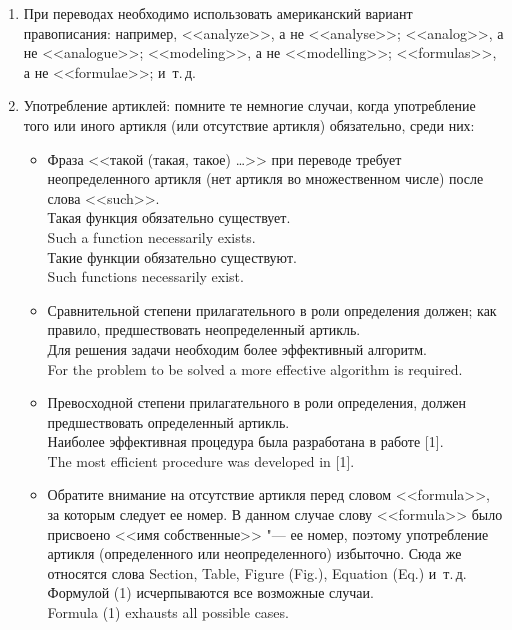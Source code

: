 \documentclass[a5paper, 10pt, twoside, numbers=enddot]{scrartcl}
\newcommand{\etc}{и~т.\,д.\xspace}
\begin{document}
\begin{enumerate}
  \item При переводах необходимо использовать американский вариант правописания: например,
    <<analyze>>, а не <<analyse>>; <<analog>>, а не <<analogue>>; <<modeling>>, а не <<modelling>>;
    <<formulas>>, а не <<formulae>>; \etc

  \item Употребление артиклей: помните те немногие случаи, когда употребление того или иного артикля
    (или отсутствие артикля) обязательно, среди них:
    \begin{itemize}
      \item Фраза <<такой (такая, такое) \ldots>> при переводе требует неопределенного артикля (нет
        артикля во множественном числе) после слова <<such>>.\\ [4pt]
        \textsf{
          Такая функция обязательно существует.\\
          Such a function necessarily exists.\\ [4pt]
          Такие функции обязательно существуют.\\
          Such functions necessarily exist.
        }

      \item Сравнительной степени прилагательного в роли определения должен; как правило,
        предшествовать неопределенный артикль.\\ [4pt]
        \textsf{
          Для решения задачи необходим более эффективный алгоритм.\\
          For the problem to be solved a more effective algorithm is required.
        }

      \item Превосходной степени прилагательного в роли определения, должен предшествовать
        определенный артикль.\\ [4pt]
        \textsf{
          Наиболее эффективная процедура была разработана в работе [1].\\
          The most efficient procedure was developed in [1].
        }

      \item Обратите внимание на отсутствие артикля перед словом <<formula>>, за которым следует ее
        номер. В данном случае слову <<formula>> было присвоено <<имя собственные>> "--- ее номер,
        поэтому употребление артикля (определенного или неопределенного) избыточно. Сюда же
        относятся слова Section, Table, Figure (Fig.), Equation (Eq.) \etc\\ [4pt]
        \textsf{
          Формулой (1) исчерпываются все возможные случаи.\\
          Formula (1) exhausts all possible cases.
        }


\end{itemize}
\end{enumerate}
\end{document}
